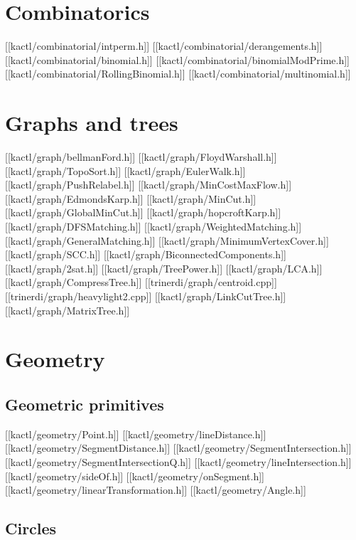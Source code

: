 \chapter{Combinatorics}

[[kactl/combinatorial/intperm.h]]
[[kactl/combinatorial/derangements.h]]
[[kactl/combinatorial/binomial.h]]
[[kactl/combinatorial/binomialModPrime.h]]
[[kactl/combinatorial/RollingBinomial.h]]
[[kactl/combinatorial/multinomial.h]]

\chapter{Graphs and trees}

[[kactl/graph/bellmanFord.h]]
[[kactl/graph/FloydWarshall.h]]
[[kactl/graph/TopoSort.h]]
[[kactl/graph/EulerWalk.h]]
[[kactl/graph/PushRelabel.h]]
[[kactl/graph/MinCostMaxFlow.h]]
[[kactl/graph/EdmondsKarp.h]]
[[kactl/graph/MinCut.h]]
[[kactl/graph/GlobalMinCut.h]]
[[kactl/graph/hopcroftKarp.h]]
[[kactl/graph/DFSMatching.h]]
[[kactl/graph/WeightedMatching.h]]
[[kactl/graph/GeneralMatching.h]]
[[kactl/graph/MinimumVertexCover.h]]
[[kactl/graph/SCC.h]]
[[kactl/graph/BiconnectedComponents.h]]
[[kactl/graph/2sat.h]]
[[kactl/graph/TreePower.h]]
[[kactl/graph/LCA.h]]
[[kactl/graph/CompressTree.h]]
[[trinerdi/graph/centroid.cpp]]
[[trinerdi/graph/heavylight2.cpp]]
[[kactl/graph/LinkCutTree.h]]
[[kactl/graph/MatrixTree.h]]

\chapter{Geometry}

\section{Geometric primitives}

[[kactl/geometry/Point.h]]
[[kactl/geometry/lineDistance.h]]
[[kactl/geometry/SegmentDistance.h]]
[[kactl/geometry/SegmentIntersection.h]]
[[kactl/geometry/SegmentIntersectionQ.h]]
[[kactl/geometry/lineIntersection.h]]
[[kactl/geometry/sideOf.h]]
[[kactl/geometry/onSegment.h]]
[[kactl/geometry/linearTransformation.h]]
[[kactl/geometry/Angle.h]]

\section{Circles}

